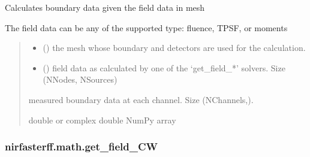\documentclass[letterpaper,10pt,english]{sphinxmanual}
\begin{document}
\begin{fulllineitems}
\label{\detokenize{_autosummary/nirfasterff.math.get_boundary_data:nirfasterff.math.get_boundary_data}}
\pysigstartsignatures
\pysiglinewithargsret
{}
{\sphinxparamcomma {}}
{}
\pysigstopsignatures
\sphinxAtStartPar
Calculates boundary data given the field data in mesh

\sphinxAtStartPar
The field data can be any of the supported type: fluence, TPSF, or moments
\begin{quote}\begin{description}
\begin{itemize}
\item {} 
\sphinxAtStartPar
{} () \textendash{} the mesh whose boundary and detectors are used for the calculation.

\item {} 
\sphinxAtStartPar
{} () \textendash{} field data as calculated by one of the ‘get\_field\_*’ solvers. Size (NNodes, NSources)

\end{itemize}

\sphinxAtStartPar
{} \textendash{} measured boundary data at each channel. Size (NChannels,).

\sphinxAtStartPar
double or complex double NumPy array

\end{description}\end{quote}

\end{fulllineitems}


\sphinxstepscope


\subsubsection{nirfasterff.math.get\_field\_CW}
\label{\detokenize{_autosummary/nirfasterff.math.get_field_CW:nirfasterff-math-get-field-cw}}\label{\detokenize{_autosummary/nirfasterff.math.get_field_CW::doc}}
\end{document}
